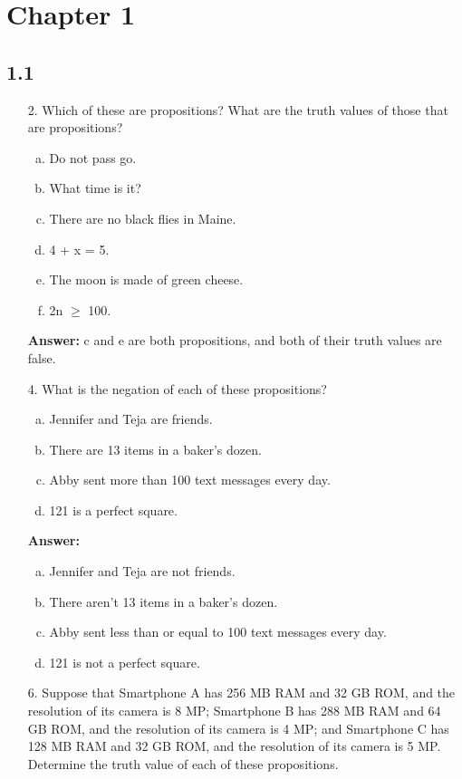 \section{Chapter 1}
\subsection{1.1}
\begin{itemize}
\item[2.]Which of these are propositions? What are the truth values of those that are propositions?
\begin {enumerate}[a.]
\item Do not pass go.
\item What time is it?
\item There are no black flies in Maine.
\item 4 + x = 5.
\item The moon is made of green cheese.
\item 2n $\geq$ 100.
\end{enumerate}
\textbf{Answer:} c and e are both propositions, and both of their truth values are false.
\item[4.]What is the negation of each of these propositions?
\begin{enumerate}[a.]
    \item Jennifer and Teja are friends.
    \item There are 13 items in a baker’s dozen.
    \item Abby sent more than 100 text messages every day.
    \item 121 is a perfect square.
\end{enumerate}
\textbf{Answer:}
\begin{enumerate}[a.]
    \item Jennifer and Teja are not friends.
    \item There aren’t 13 items in a baker’s dozen.
    \item Abby sent less than or equal to 100 text messages every day.
    \item 121 is not a perfect square.
\end{enumerate}
\item[6.]Suppose that Smartphone A has 256 MB RAM and 32 GB ROM, and the resolution of its camera is 8 MP; Smartphone B has 288 MB RAM and 64 GB ROM, and the resolution of its camera is 4 MP; and Smartphone C has 128 MB RAM and 32 GB ROM, and the resolution of
its camera is 5 MP. Determine the truth value of each of these propositions.

\end{itemize}
